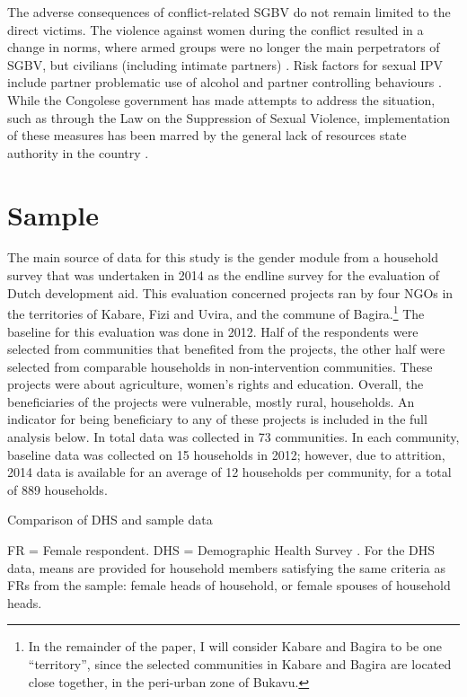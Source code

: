 The adverse consequences of conflict-related SGBV do not remain limited to the direct victims. The violence against women during the conflict resulted in a change in norms, where armed groups were no longer the main perpetrators of SGBV, but civilians (including intimate partners) \citep{Freedman2011}. Risk factors for sexual IPV include partner problematic use of alcohol and partner controlling behaviours \citep{Babalola2014}. While the Congolese government has made attempts to address the situation, such as through the Law on the Suppression of Sexual Violence, implementation of these measures has been marred by the general lack of resources state authority in the country \citep{Steiner2009}.

\section{Sample}

The main source of data for this study is the gender module from a household survey that was undertaken in 2014 as the endline survey for the evaluation of Dutch development aid. This evaluation concerned projects ran by four NGOs in the territories of Kabare, Fizi and Uvira, and the commune of Bagira.\footnote{In the remainder of the paper, I will consider Kabare and Bagira to be one ``territory'', since the selected communities in Kabare and Bagira are located close together, in the peri-urban zone of Bukavu.} The baseline for this evaluation was done in 2012. Half of the respondents were selected from communities that benefited from the projects, the other half were selected from comparable households in non-intervention communities. These projects were about agriculture, women's rights and education. Overall, the beneficiaries of the projects were vulnerable, mostly rural, households. An indicator for being beneficiary to any of these projects is included in the full analysis below. In total data was collected in 73 communities. In each community, baseline data was collected on 15 households in 2012; however, due to attrition, 2014 data is available for an average of 12 households per community, for a total of 889 households. 

\begin{threeparttable}
	\caption{Comparison of DHS and sample data}\label{tab:dhs_compare}
	\centering
	
	\begin{tablenotes}
	\small
	\item FR = Female respondent. DHS = Demographic Health Survey \citep{DHSCongoReport}. For the DHS data, means are provided for household members satisfying the same criteria as FRs from the sample: female heads of household, or female spouses of household heads. 
	\item
	\end{tablenotes}
	
\end{threeparttable}

